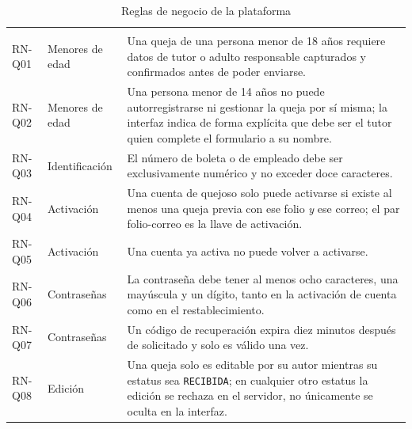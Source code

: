 	\begin{longtable}{|p{1.7cm}|p{2.7cm}|p{9.7cm}|}
		\caption{Reglas de negocio de la plataforma}
		\label{tab:reglas_negocio} \\
		\hline
		\rowcolor{headerblue}
		\headercell{ID} & \headercell{Temática} & \headercell{Regla} \\
		\hline
		\endfirsthead
	
		\hline
		\rowcolor{headerblue}
		\headercell{ID} & \headercell{Temática} & \headercell{Regla} \\
		\hline
		\endhead
	
		RN-Q01 & Menores de edad & Una queja de una persona menor de 18 años requiere datos de tutor
		o adulto responsable capturados y confirmados antes de poder enviarse. \\ \hline
	
		RN-Q02 & Menores de edad & Una persona menor de 14 años no puede autorregistrarse ni
		gestionar la queja por sí misma; la interfaz indica de forma explícita que debe ser el tutor
		quien complete el formulario a su nombre. \\ \hline
	
		RN-Q03 & Identificación & El número de boleta o de empleado debe ser exclusivamente numérico
		y no exceder doce caracteres. \\ \hline
	
		RN-Q04 & Activación & Una cuenta de quejoso solo puede activarse si existe al menos una queja
		previa con ese folio \emph{y} ese correo; el par folio-correo es la llave de activación.
		\\ \hline
	
		RN-Q05 & Activación & Una cuenta ya activa no puede volver a activarse. \\ \hline
	
		RN-Q06 & Contraseñas & La contraseña debe tener al menos ocho caracteres, una mayúscula y un
		dígito, tanto en la activación de cuenta como en el restablecimiento. \\ \hline
	
		RN-Q07 & Contraseñas & Un código de recuperación expira diez minutos después de solicitado y
		solo es válido una vez. \\ \hline
	
		RN-Q08 & Edición & Una queja solo es editable por su autor mientras su estatus sea
		\texttt{RECIBIDA}; en cualquier otro estatus la edición se rechaza en el servidor, no
		únicamente se oculta en la interfaz. \\ \hline
	

\end{longtable}
